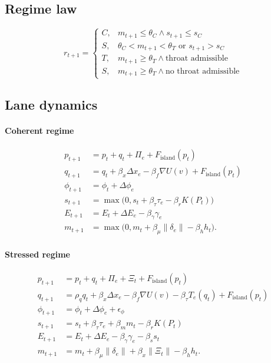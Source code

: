 \documentclass[11pt,a4paper]{article}
\begin{document}
\subsection{Regime law}

\begin{equation}
r_{t+1}=
\begin{cases}
C, & m_{t+1}\le\theta_C \land s_{t+1}\le s_C\\
S, & \theta_C<m_{t+1}<\theta_T \text{ or } s_{t+1}>s_C\\
T, & m_{t+1}\ge\theta_T \land \text{throat admissible}\\
S, & m_{t+1}\ge\theta_T \land \text{no throat admissible}
\end{cases}
\label{eq:regime_update}
\end{equation}

\subsection{Lane dynamics}

\paragraph{Coherent regime}
\begin{align}
p_{t+1}&=p_t+q_t+\Pi_e+F_{\mathrm{island}}(p_t)
\label{eq:coh_pos}\\
q_{t+1}&=q_t+\beta_x\Delta x_e-\beta_f\nabla U(v)+F_{\mathrm{island}}(p_t)
\label{eq:coh_vel}\\
\phi_{t+1}&=\phi_t+\Delta\phi_e
\label{eq:coh_phase}\\
s_{t+1}&=\max\bigl(0,s_t+\beta_\tau\tau_e-\beta_r K(P_t)\bigr)
\label{eq:coh_stress}\\
E_{t+1}&=E_t+\Delta E_e-\beta_\gamma\gamma_e
\label{eq:coh_energy}\\
m_{t+1}&=\max\bigl(0,m_t+\beta_\mu\|\delta_e\|-\beta_h h_t\bigr).
\label{eq:coh_mismatch}
\end{align}

\paragraph{Stressed regime}
\begin{align}
p_{t+1}&=p_t+q_t+\Pi_e+\Xi_t+F_{\mathrm{island}}(p_t)
\label{eq:str_pos}\\
q_{t+1}&=\rho_q q_t+\beta_x\Delta x_e-\beta_f\nabla U(v)-\beta_\tau T_e(q_t)+F_{\mathrm{island}}(p_t)
\label{eq:str_vel}\\
\phi_{t+1}&=\phi_t+\Delta\phi_e+\epsilon_\phi
\label{eq:str_phase}\\
s_{t+1}&=s_t+\beta_\tau\tau_e+\beta_m m_t-\beta_r K(P_t)
\label{eq:str_stress}\\
E_{t+1}&=E_t+\Delta E_e-\beta_\gamma\gamma_e-\beta_s s_t
\label{eq:str_energy}\\
m_{t+1}&=m_t+\beta_\mu\|\delta_e\|+\beta_x\|\Xi_t\|-\beta_h h_t.
\label{eq:str_mismatch}
\end{align}
\end{document}
